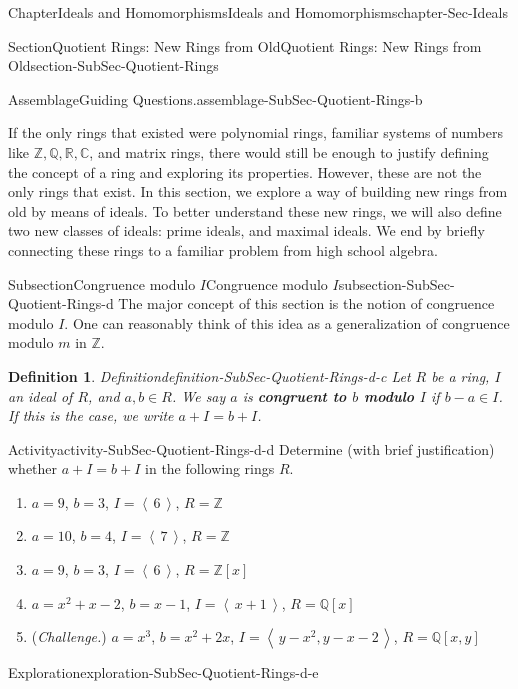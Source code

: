 \documentclass[oneside,10pt,]{book}
\newcommand{\terminology}[1]{\textbf{#1}}
\numberwithin{equation}{section}
\newcommand{\ideal}[1]{\left\langle\, #1 \,\right\rangle}
\def\C{{\mathbb C}}
\def\Z{{\mathbb Z}}
\def\Q{{\mathbb Q}}
\def\R{{\mathbb R}}
\newtheorem{definition}[theorem]{Definition}
\begin{document}
\begin{chapterptx}{Chapter}{Ideals and Homomorphisms}{}{Ideals and Homomorphisms}{}{}{chapter-Sec-Ideals}
\begin{sectionptx}{Section}{Quotient Rings: New Rings from Old}{}{Quotient Rings: New Rings from Old}{}{}{section-SubSec-Quotient-Rings}
\begin{assemblage}{Assemblage}{Guiding Questions.}{assemblage-SubSec-Quotient-Rings-b}
%
\end{assemblage}
\begin{introduction}{}%
If the only rings that existed were polynomial rings, familiar systems of numbers like \(\Z, \Q, \R, \C\), and matrix rings, there would still be enough to justify defining the concept of a ring and exploring its properties. However, these are not the only rings that exist. In this section, we explore a way of building new rings from old by means of ideals. To better understand these new rings, we will also define two new classes of ideals: prime ideals, and maximal ideals. We end by briefly connecting these rings to a familiar problem from high school algebra.%
\end{introduction}%
%
%
\typeout{************************************************}
\typeout{************************************************}
%
\begin{subsectionptx}{Subsection}{Congruence modulo \(I\)}{}{Congruence modulo \(I\)}{}{}{subsection-SubSec-Quotient-Rings-d}
The major concept of this section is the notion of congruence modulo \(I\). One can reasonably think of this idea as a generalization of congruence modulo \(m\) in \(\Z\).%
\begin{definition}{Definition}{}{definition-SubSec-Quotient-Rings-d-c}%
%
Let \(R\) be a ring, \(I\) an ideal of \(R\), and \(a,b\in R\). We say \(a\) is \terminology{congruent to \(b\) modulo \(I\)} if \(b-a\in I\). If this is the case, we write \(a + I = b + I\).%
\end{definition}
\begin{activity}{Activity}{}{activity-SubSec-Quotient-Rings-d-d}%
Determine (with brief justification) whether \(a + I = b + I\) in the following rings \(R\).%
%
\begin{enumerate}
\item{}\(a = 9\), \(b = 3\), \(I = \ideal{6}\), \(R = \Z\)%
\item{}\(a = 10\), \(b = 4\), \(I = \ideal{7}\), \(R = \Z\)%
\item{}\(a = 9\), \(b = 3\), \(I = \ideal{6}\), \(R = \Z[x]\)%
\item{}\(a = x^2+x-2\), \(b = x-1\), \(I = \ideal{x+1}\), \(R = \Q[x]\)%
\item{}(\emph{Challenge.}) \(a = x^3\), \(b = x^2+2x\), \(I = \ideal{y-x^2, y-x-2}\), \(R = \Q[x,y]\)%
\end{enumerate}
\end{activity}%
\begin{exploration}{Exploration}{}{exploration-SubSec-Quotient-Rings-d-e}%

\end{exploration}
\end{subsectionptx}
\end{sectionptx}
\end{chapterptx}
\end{document}
